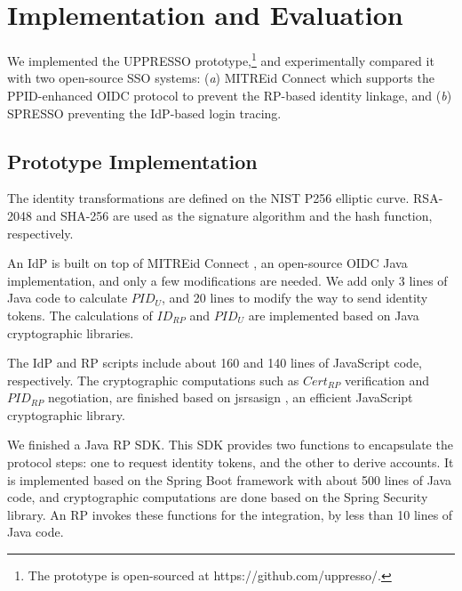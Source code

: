 \section{Implementation and Evaluation}
\label{sec:implementation}
We implemented the UPPRESSO prototype,\footnote{The prototype is open-sourced at https://github.com/uppresso/.}
 and experimentally compared it
 with two open-source SSO systems:
  (\emph{a}) MITREid Connect \cite{MITREid}
    which supports the PPID-enhanced OIDC protocol to prevent the RP-based identity linkage,
     and (\emph{b}) SPRESSO \cite{SPRESSO} preventing the IdP-based login tracing.

\subsection{Prototype Implementation}
\label{subsec:proto-imple}
The identity transformations are defined on
        the NIST P256 elliptic curve.
RSA-2048 and SHA-256 are used as the signature algorithm and the hash function, respectively.

An IdP is built on top of MITREid Connect \cite{MITREid},
    an open-source OIDC Java implementation, %
    and only a few modifications are needed.
We add only 3 lines of Java code to calculate $PID_U$,
    and 20 lines to modify the way to send identity tokens.
The calculations of $ID_{RP}$ and $PID_U$ are implemented based on Java cryptographic libraries.

The IdP and RP scripts include about 160 and 140 lines of JavaScript code, respectively.
The cryptographic computations such as $Cert_{RP}$ verification and $PID_{RP}$ negotiation, are finished based on jsrsasign \cite{jsrsasign}, an efficient JavaScript cryptographic library.


We finished a Java RP SDK.
This SDK provides two functions to encapsulate the protocol steps:
 one to request identity tokens,
    and the other to derive accounts. %
It is implemented based on the Spring Boot framework  with about 500 lines of Java code,
 and cryptographic computations are done based on the Spring Security library.
An RP invokes these functions for the integration,
    by less than 10 lines of Java code.
